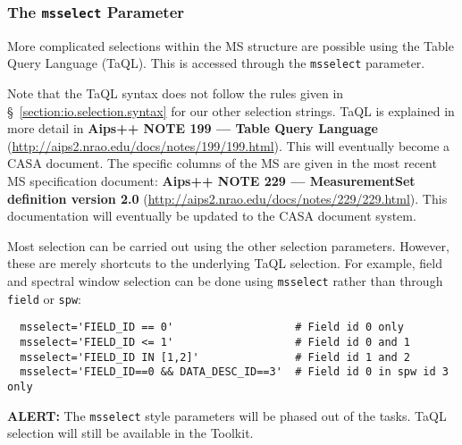 \subsubsection{The {\tt msselect} Parameter}
\label{section:io.selection.selectdata.msselect}

More complicated selections within the MS structure are possible
using the Table Query Language (TaQL).  This is accessed through
the {\tt msselect} parameter.

Note that the TaQL syntax does not follow the rules given in 
\S~\ref{section:io.selection.syntax} for our other selection strings.
TaQL is explained in more detail in {\bf Aips++ NOTE 199 --- 
Table Query Language}
(\url{http://aips2.nrao.edu/docs/notes/199/199.html}).
This will eventually become a CASA document.  The specific 
columns of the MS are given in the most recent MS specification
document: {\bf Aips++ NOTE 229 --- MeasurementSet definition version 2.0}
(\url{http://aips2.nrao.edu/docs/notes/229/229.html}).
This documentation will eventually be updated to the CASA 
document system.

Most selection can be carried out using the other
selection parameters.  However, these are merely shortcuts
to the underlying TaQL selection.  For example, field
and spectral window selection can be done using {\tt msselect}
rather than through {\tt field} or {\tt spw}:
\small
\begin{verbatim}
  msselect='FIELD_ID == 0'                   # Field id 0 only
  msselect='FIELD_ID <= 1'                   # Field id 0 and 1
  msselect='FIELD_ID IN [1,2]'               # Field id 1 and 2
  msselect='FIELD_ID==0 && DATA_DESC_ID==3'  # Field id 0 in spw id 3 only
\end{verbatim}
\normalsize

{\bf ALERT:} The {\tt msselect} style parameters will be phased
out of the tasks.  TaQL selection will still be available in the
Toolkit.

